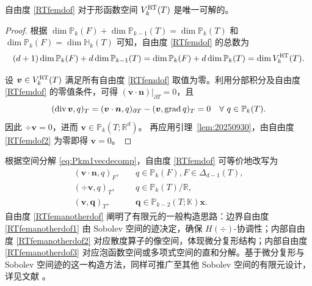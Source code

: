 \begin{lemma}\label{lem:unisovlenRTfem}
自由度 \eqref{RTfemdof} 对于形函数空间 $V_k^{\rm RT}(T)$ 是唯一可解的。
\end{lemma}
\begin{proof}
根据 $\dim\mathbb P_{k}(F)+\dim\mathbb P_{k-1}(T)=\dim\mathbb P_{k}(T)$ 和 $\dim\mathbb P_{k}(F)=\dim \mathbb H_{k}(T)$ 可知，自由度 \eqref{RTfemdof} 的总数为
\begin{equation*}
(d+1)\dim\mathbb P_{k}(F)+d\dim\mathbb P_{k-1}(T) = \dim\mathbb P_{k}(F)+d\dim\mathbb P_{k}(T) = \dim V_k^{\rm RT}(T).
\end{equation*}

设 $\boldsymbol{v}\in V_k^{\rm RT}(T)$ 满足所有自由度 \eqref{RTfemdof} 取值为零。利用分部积分及自由度 \eqref{RTfemdof} 的零值条件，可得 $(\boldsymbol{v}\cdot\boldsymbol{n})|_{\partial T}=0$，且 
\begin{equation*}
(\operatorname{div}\boldsymbol{v}, q)_T=(\boldsymbol{v}\cdot\boldsymbol{n},q)_{\partial T} - (\boldsymbol{v},\operatorname{grad} q)_T=0\quad\forall~q\in \mathbb P_{k}(T).
\end{equation*}
因此 $\div\boldsymbol{v}=0$，进而 $\boldsymbol{v}\in \mathbb P_{k}(T; \mathbb R^d)$。
再应用引理~\ref{lem:20250930}，由自由度 \eqref{RTfemdof2} 为零即得 $\boldsymbol{v}=0$。
\end{proof}

根据空间分解 \eqref{eq:Pkm1vecdecomp}，自由度 \eqref{RTfemdof} 可等价地改写为
\begin{subequations}\label{RTfemanotherdof}
\begin{align}
(\boldsymbol v\cdot\boldsymbol  n, q)_F, & \quad q\in\mathbb P_{k}(F),  F\in\Delta_{d-1}(T),\label{RTfemanotherdof1}\\
(\div\boldsymbol v, q)_T, & \quad q\in\mathbb P_{k}(T)/\mathbb R, \label{RTfemanotherdof2}\\
(\boldsymbol v, \boldsymbol q)_T, & \quad \boldsymbol q\in\mathbb P_{k-2}(T;\mathbb K)\boldsymbol x. \label{RTfemanotherdof3}
\end{align}
\end{subequations} 
自由度 \eqref{RTfemanotherdof} 阐明了有限元的一般构造思路：边界自由度 \eqref{RTfemanotherdof1} 由 Sobolev 空间的迹决定，确保 $H(\div)$-协调性；内部自由度 \eqref{RTfemanotherdof2} 对应散度算子的像空间，体现微分复形结构；内部自由度 \eqref{RTfemanotherdof3} 对应泡函数空间或多项式空间的直和分解。基于微分复形与 Sobolev 空间迹的这一构造方法，同样可推广至其他 Sobolev 空间的有限元设计，详见文献 \cite{ChenHuang2022}。

